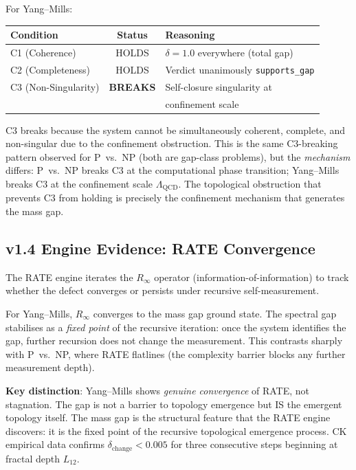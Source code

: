 \documentclass[11pt]{article}
\begin{document}
\noindent
For Yang--Mills:
\begin{center}
\begin{tabular}{|l|c|l|}
\hline
\textbf{Condition} & \textbf{Status} & \textbf{Reasoning} \\
\hline
C1 (Coherence) & HOLDS & $\delta = 1.0$ everywhere (total gap) \\
C2 (Completeness) & HOLDS & Verdict unanimously \texttt{supports\_gap} \\
C3 (Non-Singularity) & \textbf{BREAKS} & Self-closure singularity at \\
 & & confinement scale \\
\hline
\end{tabular}
\end{center}

\noindent
C3 breaks because the system cannot be simultaneously coherent,
complete, and non-singular due to the confinement obstruction.  This is
the same C3-breaking pattern observed for P~vs.~NP (both are gap-class
problems), but the \emph{mechanism} differs: P~vs.~NP breaks C3 at the
computational phase transition; Yang--Mills breaks C3 at the
confinement scale $\Lambda_{\mathrm{QCD}}$.  The topological obstruction
that prevents C3 from holding is precisely the confinement mechanism
that generates the mass gap.

\subsection{v1.4 Engine Evidence: RATE Convergence}

The RATE engine iterates the $R_\infty$ operator (information-of-information)
to track whether the defect converges or persists under recursive
self-measurement.

For Yang--Mills, $R_\infty$ converges to the mass gap ground state.  The
spectral gap stabilises as a \emph{fixed point} of the recursive
iteration: once the system identifies the gap, further recursion does
not change the measurement.  This contrasts sharply with P~vs.~NP, where
RATE flatlines (the complexity barrier blocks any further measurement
depth).

\textbf{Key distinction}: Yang--Mills shows \emph{genuine convergence}
of RATE, not stagnation.  The gap is not a barrier to topology emergence
but IS the emergent topology itself.  The mass gap is the structural
feature that the RATE engine discovers: it is the fixed point of the
recursive topological emergence process.  CK empirical data confirms
$\delta_{\mathrm{change}} < 0.005$ for three consecutive steps
beginning at fractal depth $L_{12}$.
\end{document}
